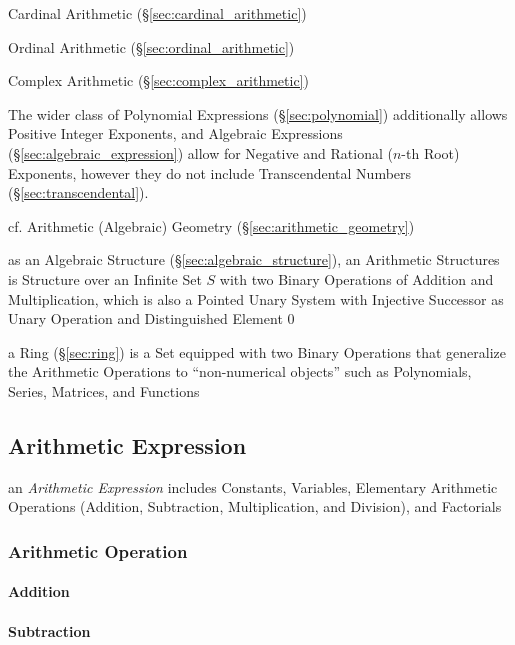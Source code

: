 Cardinal Arithmetic (\S\ref{sec:cardinal_arithmetic})

Ordinal Arithmetic (\S\ref{sec:ordinal_arithmetic})

Complex Arithmetic (\S\ref{sec:complex_arithmetic})

The wider class of Polynomial Expressions (\S\ref{sec:polynomial}) additionally
allows Positive Integer Exponents, and Algebraic Expressions
(\S\ref{sec:algebraic_expression}) allow for Negative and Rational ($n$-th
Root) Exponents, however they do not include Transcendental Numbers
(\S\ref{sec:transcendental}).

\fist cf. Arithmetic (Algebraic) Geometry
(\S\ref{sec:arithmetic_geometry})

as an Algebraic Structure (\S\ref{sec:algebraic_structure}), an Arithmetic
Structures is Structure over an Infinite Set $S$ with two Binary Operations of
Addition and Multiplication, which is also a Pointed Unary System with
Injective Successor as Unary Operation and Distinguished Element $0$

a Ring (\S\ref{sec:ring}) is a Set equipped with two Binary Operations that
generalize the Arithmetic Operations to ``non-numerical objects'' such as
Polynomials, Series, Matrices, and Functions



\subsection{Arithmetic Expression}\label{sec:arithmetic_expression}

an \emph{Arithmetic Expression} includes Constants, Variables, Elementary
Arithmetic Operations (Addition, Subtraction, Multiplication, and Division), and
Factorials



\subsubsection{Arithmetic Operation}\label{sec:arithmetic_operation}

\paragraph{Addition}\label{sec:addition}\hfill

\paragraph{Subtraction}\label{sec:subtraction}\hfill

